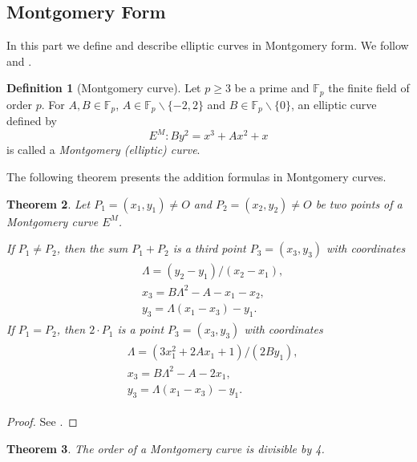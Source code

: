 \documentclass{article}
\newcommand{\Fp}{\ensuremath{\mathbb{F}_p}}
\newcommand{\point}[1]{P_{#1} = (x_{#1}, y_{#1})}
\newtheorem{thm}{Theorem}[section]
\theoremstyle{definition}
\newtheorem{defn}[thm]{Definition}
\theoremstyle{remark}
\begin{document}
\begin{spacing}{1.2}
\begin{multicols}{2}
\subsection{Montgomery Form}

In this part we define and describe elliptic curves in Montgomery form. We follow \cite{Okeya:2000:ECM:648117.746614} and \cite{cryptoeprint:2008:013}.

\begin{defn}[Montgomery curve]
Let $p\geq 3$ be a prime and $\Fp$ the finite field of order $p$. For $A, B\in\Fp$, 
$A\in \Fp\backslash\{-2,2\}$ and $B\in\Fp\backslash\{0\}$, an elliptic curve defined by 
	$$ E^M : B y^2 = x^3 + A x^2 + x $$ 
is called a {\it Montgomery (elliptic) curve}.
\end{defn}

The following theorem presents the addition formulas in Montgomery curves. %
		
\begin{thm}%
Let $\point{1}\not=O$ and $\point{2}\not=O$ be two points of a Montgomery curve $E^M$. 

If $P_1\not=P_2$, then the sum $P_1 + P_2$ is a third point $P_3 = (x_3, y_3)$ with coordinates
	\begin{align} \label{eq-ted}
	\begin{split}
		&\Lambda = (y_2-y_1)/ (x_2-x_1),\\
		&x_3 = B\Lambda^2 - A - x_1 - x_2,\\
		&y_3 = \Lambda(x_1- x_3) - y_1.
	\end{split}
	\end{align}
%
If $P_1 = P_2$, then $2\cdot P_1$ is a point $P_3 = (x_3, y_3)$ with coordinates
	\begin{align} \label{eq-mont}
	\begin{split}
		&\Lambda = (3x_1^2 + 2Ax_1 + 1)/ (2By_1),\\
		&x_3 = B\Lambda^2 - A - 2x_1,\\
		&y_3 = \Lambda(x_1- x_3) - y_1.
	\end{split}	
	\end{align}
\end{thm}

\begin{proof}
See \cite{montgomery}.
\end{proof}

\begin{thm}%
The order of a Montgomery curve is divisible by 4.
\end{thm}


\end{multicols}
\end{spacing}
\end{document}
